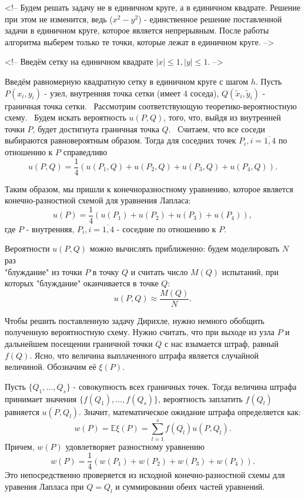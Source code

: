 \documentclass[11pt]{report}
\begin{document}
<!-- Будем решать задачу не в единичном круге, а в единичном квадрате. Решение при этом не изменится, ведь ($x^2-y^2$) - единственное решение поставленной задачи в единичном круге, которое является непрерывным. После работы алгоритма выберем только те точки, которые лежат в единичном круге. -->

<!-- Введём сетку на единичном квадрате $|x|\leqslant1, |y|\leqslant1$. -->

Введём равномерную квадратную сетку в единичном круге с шагом $h$. Пусть $P(x_i,y_i)$ - узел, внутренняя точка сетки (имеет 4 соседа), $Q(\tilde{x}_i,\tilde{y}_i)$ - граничная точка сетки. \
Рассмотрим соответствующую теоретико-вероятностную схему. \
Будем искать вероятность $u(P,Q)$, того, что, выйдя из внутренней точки $P$, будет достигнута граничная точка $Q$. \
Считаем, что все соседи выбираются равновероятным образом. Тогда для соседних точек $P_i,i=\overline{1,4}$ по отношению к $P$ справедливо
$$
u(P,Q) = \dfrac{1}{4}\left( u(P_1,Q) + u(P_2, Q) + u(P_3, Q) + u(P_4, Q) \right).
$$

Таким образом, мы пришли к конечноразностному уравнению, которое является \\
конечно-разностной схемой для уравнения Лапласа:
$$
u(P) = \dfrac{1}{4}\left( u(P_1) + u(P_2) + u(P_3) + u(P_4) \right),
$$
где $P$ - внутренняя, $P_i,i=\overline{1,4}$ - соседние по отношению к $P$.

Вероятности $u(P,Q)$ можно вычислять приближенно: будем моделировать $N$ раз \\
"блуждание" из точки $P$ в точку $Q$ и считать число $M(Q)$ испытаний, при которых "блуждание" оканчивается в точке $Q$:
$$
u(P,Q)\approx \frac{M(Q)}{N}.
$$

Чтобы решить поставленную задачу Дирихле, нужно немного обобщить полученную вероятностную схему. Нужно считать, что при выходе из узла $P$ и дальнейшем посещении граничной точки $Q$ с нас взымается штраф, равный $f(Q)$. Ясно, что величина выплаченного штрафа является случайной величиной. Обозначим её $\xi(P)$.

Пусть $\{Q_1,\dots,Q_s\}$ - совокупность всех граничных точек.
Тогда величина штрафа принимает значения $\{f(Q_1),\dots,f(Q_s)\}$, вероятность заплатить $f(Q_l)$ равняется $u(P,Q_l)$.
Значит, математическое ожидание штрафа определяется как:
$$
w(P) = \mathbb{E}\xi(P) = \sum_{l=1}^{s}f(Q_l)u(P,Q_l).
$$
Причем, $w(P)$ удовлетворяет разностному уравнению
$$
w(P) = \dfrac{1}{4}\left( w(P_1) + w(P_2) + w(P_3) + w(P_4) \right).
$$
Это непосредственно проверяется из исходной конечно-разностной схемы для уравения Лапласа при $Q=Q_l$ и суммировании обеих частей уравнений.
\end{document}
